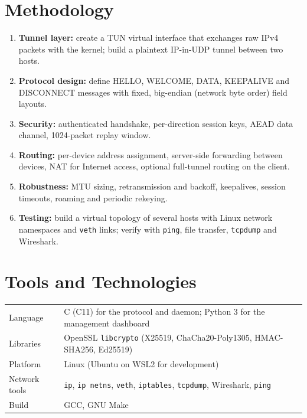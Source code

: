 \documentclass[12pt,a4paper]{article}
\begin{document}
\section{Methodology}
\begin{enumerate}
  \item \textbf{Tunnel layer:} create a TUN virtual interface that exchanges raw IPv4 packets
        with the kernel; build a plaintext IP-in-UDP tunnel between two hosts.
  \item \textbf{Protocol design:} define HELLO, WELCOME, DATA, KEEPALIVE and DISCONNECT messages
        with fixed, big-endian (network byte order) field layouts.
  \item \textbf{Security:} authenticated handshake, per-direction session keys, AEAD data channel,
        1024-packet replay window.
  \item \textbf{Routing:} per-device address assignment, server-side forwarding between devices,
        NAT for Internet access, optional full-tunnel routing on the client.
  \item \textbf{Robustness:} MTU sizing, retransmission and backoff, keepalives, session timeouts,
        roaming and periodic rekeying.
  \item \textbf{Testing:} build a virtual topology of several hosts with Linux network namespaces
        and \texttt{veth} links; verify with \texttt{ping}, file transfer, \texttt{tcpdump} and Wireshark.
\end{enumerate}

\section{Tools and Technologies}
\begin{tabularx}{\textwidth}{@{}lX@{}}
\toprule
Language & C (C11) for the protocol and daemon; Python 3 for the management dashboard\\
Libraries & OpenSSL \texttt{libcrypto} (X25519, ChaCha20-Poly1305, HMAC-SHA256, Ed25519)\\
Platform & Linux (Ubuntu on WSL2 for development)\\
Network tools & \texttt{ip}, \texttt{ip netns}, \texttt{veth}, \texttt{iptables}, \texttt{tcpdump}, Wireshark, \texttt{ping}\\
Build & GCC, GNU Make\\
\bottomrule
\end{tabularx}
\end{document}
